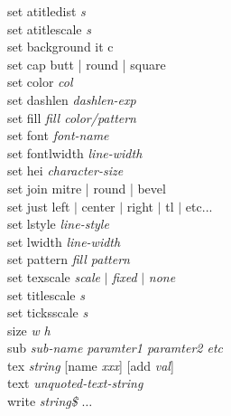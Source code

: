 {\sf set atitledist {\it s}}  \\
{\sf set atitlescale {\it s}}  \\
{\sf set background {it c}} \\
{\sf set cap {\sf butt | round | square}}  \\
{\sf set color {\it col}}  \\
{\sf set dashlen {\it dashlen-exp}}  \\
{\sf set fill {\it fill color/pattern}}  \\
{\sf set font {\it font-name}}  \\
{\sf set fontlwidth {\it line-width}}  \\
{\sf set hei {\it character-size}}  \\
{\sf set join {\sf mitre | round | bevel }}  \\
{\sf set just left $|$ center $|$ right  $|$ tl $|$ etc...}  \\
{\sf set lstyle {\it line-style}}  \\
{\sf set lwidth {\it line-width}}  \\
{\sf set pattern {\it fill pattern}}  \\
{\sf set texscale {\it scale} $|$ {\it fixed} $|$ {\it none}} \\
{\sf set titlescale {\it s}}  \\
{\sf set ticksscale {\it s}}  \\
{\sf size {\it w} {\it h}}  \\
{\sf sub {\it sub-name paramter1 paramter2 etc}}  \\
{\sf tex {\it string} [name {\it xxx}] [add {\it val}]}  \\
{\sf text {\it unquoted-text-string}}  \\
{\sf write {\it string\$} $\ldots$}

